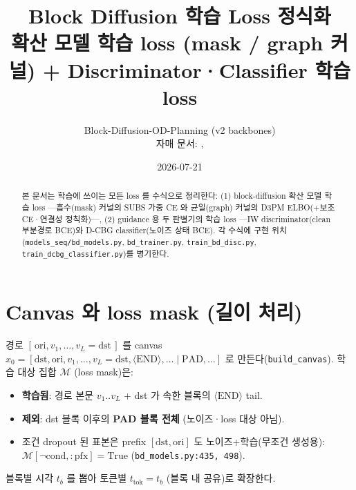 \documentclass[11pt]{article}
\title{\bfseries Block Diffusion 학습 Loss 정식화\\[2pt]
\large 확산 모델 학습 loss (mask / graph 커널) + Discriminator·Classifier 학습 loss}
\author{Block-Diffusion-OD-Planning \quad (v2 backbones) \\[-1pt]
\small 자매 문서: \code{BD\_BLOCK\_GUIDANCE\_MATH.pdf}, \code{BD\_DCBG\_MATH.pdf}}
\date{2026-07-21}
\newcommand{\code}[1]{\texttt{\small #1}}
\newcommand{\bLM}{\mathcal{M}}
\theoremstyle{definition}
\begin{document}
\maketitle

\begin{abstract}
\noindent
본 문서는 학습에 쓰이는 모든 loss 를 수식으로 정리한다:
(1) block-diffusion 확산 모델 학습 loss —흡수(mask) 커널의 SUBS 가중 CE 와
균일(graph) 커널의 D3PM ELBO(+보조 CE·연결성 정칙화)—,
(2) guidance 용 두 판별기의 학습 loss —IW discriminator(clean 부분경로 BCE)와
D-CBG classifier(노이즈 상태 BCE). 각 수식에 구현 위치(\code{models\_seq/bd\_models.py},
\code{bd\_trainer.py}, \code{train\_bd\_disc.py}, \code{train\_dcbg\_classifier.py})를 병기한다.
\end{abstract}

\section{Canvas 와 loss mask (길이 처리)}
경로 $[\,\text{ori},v_1,\dots,v_L{=}\text{dst}\,]$ 를 canvas
$x_0=[\text{dst},\text{ori},v_1,\dots,v_L{=}\text{dst},\langle\text{END}\rangle,\dots\mid \text{PAD},\dots]$
로 만든다(\code{build\_canvas}). 학습 대상 집합 $\bLM$ (loss mask)은:
\begin{itemize}[nosep,leftmargin=1.4em]
  \item \textbf{학습됨}: 경로 본문 $v_1..v_L$ + dst 가 속한 블록의 $\langle\text{END}\rangle$ tail.
  \item \textbf{제외}: dst 블록 이후의 \textbf{PAD 블록 전체} (노이즈·loss 대상 아님).
  \item 조건 dropout 된 표본은 prefix $[\text{dst},\text{ori}]$ 도 노이즈+학습(무조건 생성용): $\bLM[\neg\text{cond},{:}\text{pfx}]{=}\text{True}$
        (\code{bd\_models.py:435, 498}).
\end{itemize}
블록별 시각 $t_b$ 를 뽑아 토큰별 $t_{\text{tok}}=t_b$ (블록 내 공유)로 확장한다.

\end{document}
